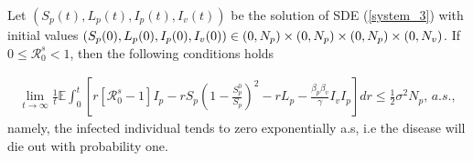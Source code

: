\begin{theorem}%
	Let $(S_p(t),L_p(t),I_p(t),I_v(t))$ be the solution of SDE (\ref{system_3}) with initial values $(S_p(0),L_p(0),I_p(0),I_v(0))\in (0,N_p)\times(0,N_p)\times(0,N_p)\\\times(0,N_v)$. If $0\leq \mathcal{R}^s_0<1$, then the following conditions holds
	
	\begin{align*}
	\lim\limits_{t\rightarrow \infty}\frac{1}{t}\mathbb{E}\int_{0}^{t}\left[{r[\mathcal{R}^s_0-1]I_p-rS_p\left(1-\frac{S^0_p}{S_p}\right)^2-rL_p-\frac{\beta_p\beta_v}{\gamma}I_vI_p}\right]dr\leq \frac{1}{2}\sigma^2N_p,\, a.s.,
	\end{align*}
	namely, the infected individual tends to zero exponentially a.s, i.e the disease will die out with probability one.
\end{theorem}

